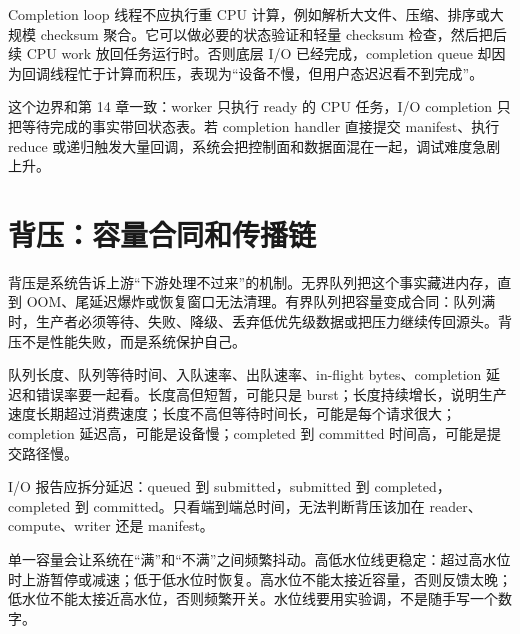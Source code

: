 Completion loop 线程不应执行重 CPU 计算，例如解析大文件、压缩、排序或大规模 checksum 聚合。它可以做必要的状态验证和轻量 checksum 检查，然后把后续 CPU work 放回任务运行时。否则底层 I/O 已经完成，completion queue 却因为回调线程忙于计算而积压，表现为“设备不慢，但用户态迟迟看不到完成”。

这个边界和第 14 章一致：worker 只执行 ready 的 CPU 任务，I/O completion 只把等待完成的事实带回状态表。若 completion handler 直接提交 manifest、执行 reduce 或递归触发大量回调，系统会把控制面和数据面混在一起，调试难度急剧上升。

\section{背压：容量合同和传播链}

背压是系统告诉上游“下游处理不过来”的机制。无界队列把这个事实藏进内存，直到 OOM、尾延迟爆炸或恢复窗口无法清理。有界队列把容量变成合同：队列满时，生产者必须等待、失败、降级、丢弃低优先级数据或把压力继续传回源头。背压不是性能失败，而是系统保护自己。

队列长度、队列等待时间、入队速率、出队速率、in-flight bytes、completion 延迟和错误率要一起看。长度高但短暂，可能只是 burst；长度持续增长，说明生产速度长期超过消费速度；长度不高但等待时间长，可能是每个请求很大；completion 延迟高，可能是设备慢；completed 到 committed 时间高，可能是提交路径慢。

I/O 报告应拆分延迟：queued 到 submitted，submitted 到 completed，completed 到 committed。只看端到端总时间，无法判断背压该加在 reader、compute、writer 还是 manifest。

单一容量会让系统在“满”和“不满”之间频繁抖动。高低水位线更稳定：超过高水位时上游暂停或减速；低于低水位时恢复。高水位不能太接近容量，否则反馈太晚；低水位不能太接近高水位，否则频繁开关。水位线要用实验调，不是随手写一个数字。

